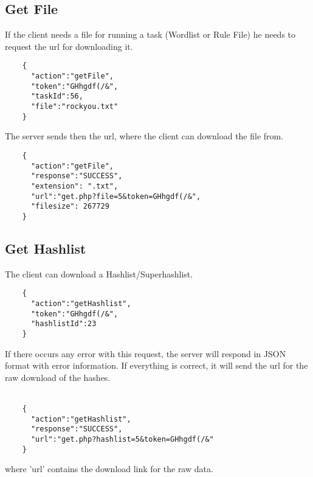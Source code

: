 \documentclass{article}
\begin{document}
	\subsection*{Get File}
	If the client needs a file for running a task (Wordlist or Rule File) he needs to request the url for downloading it.
	\begin{verbatim}
	{
	  "action":"getFile",
	  "token":"GHhgdf(/&",
	  "taskId":56,
	  "file":"rockyou.txt"
	}
	\end{verbatim}
	The server sends then the url, where the client can download the file from.
	\begin{verbatim}
	{
	  "action":"getFile",
	  "response":"SUCCESS",
	  "extension": ".txt",
	  "url":"get.php?file=5&token=GHhgdf(/&",
	  "filesize": 267729
	}
	\end{verbatim}
	
	\subsection*{Get Hashlist}
	The client can download a Hashlist/Superhashlist.
	\begin{verbatim}
	{
	  "action":"getHashlist",
	  "token":"GHhgdf(/&",
	  "hashlistId":23
	}
	\end{verbatim}
	If there occurs any error with this request, the server will respond in JSON format with error information. If everything is correct, it will send the url for the raw download of the hashes.\\\\
	\begin{verbatim}
	{
	  "action":"getHashlist",
	  "response":"SUCCESS",
	  "url":"get.php?hashlist=5&token=GHhgdf(/&"
	}
	\end{verbatim}
	where 'url' contains the download link for the raw data.
	
\end{document}
